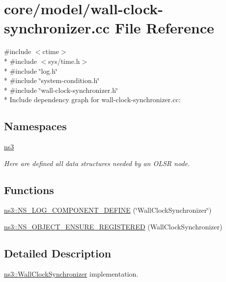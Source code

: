 \hypertarget{wall-clock-synchronizer_8cc}{}\section{core/model/wall-\/clock-\/synchronizer.cc File Reference}
\label{wall-clock-synchronizer_8cc}
{\ttfamily \#include $<$ctime$>$}\\*
{\ttfamily \#include $<$sys/time.\+h$>$}\\*
{\ttfamily \#include \char`\"{}log.\+h\char`\"{}}\\*
{\ttfamily \#include \char`\"{}system-\/condition.\+h\char`\"{}}\\*
{\ttfamily \#include \char`\"{}wall-\/clock-\/synchronizer.\+h\char`\"{}}\\*
Include dependency graph for wall-\/clock-\/synchronizer.cc\+:
\subsection*{Namespaces}
\begin{DoxyCompactItemize}
\item 
 \hyperlink{namespacens3}{ns3}
\begin{DoxyCompactList}\small\item\em Here are defined all data structures needed by an O\+L\+SR node. \end{DoxyCompactList}\end{DoxyCompactItemize}
\subsection*{Functions}
\begin{DoxyCompactItemize}
\item 
\hyperlink{namespacens3_aabeb1bcc70cbc9957d96fbfcf2a63094}{ns3\+::\+N\+S\+\_\+\+L\+O\+G\+\_\+\+C\+O\+M\+P\+O\+N\+E\+N\+T\+\_\+\+D\+E\+F\+I\+NE} (\char`\"{}Wall\+Clock\+Synchronizer\char`\"{})
\item 
\hyperlink{namespacens3_a50f4b34ba003e17399d68a757cebc567}{ns3\+::\+N\+S\+\_\+\+O\+B\+J\+E\+C\+T\+\_\+\+E\+N\+S\+U\+R\+E\+\_\+\+R\+E\+G\+I\+S\+T\+E\+R\+ED} (Wall\+Clock\+Synchronizer)
\end{DoxyCompactItemize}


\subsection{Detailed Description}
\hyperlink{classns3_1_1WallClockSynchronizer}{ns3\+::\+Wall\+Clock\+Synchronizer} implementation. 